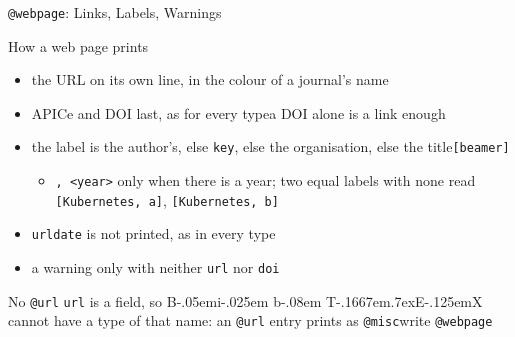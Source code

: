 \documentclass[presentation,\almamaterseal,apice]{beamer}\mode<presentation>{\usetheme{\almamaterpreset}}
\def\BibTeX{{\rm B\kern-.05em{\sc i\kern-.025em b}\kern-.08em
    T\kern-.1667em\lower.7ex\hbox{E}\kern-.125emX}}
\begin{document}
\begin{frame}[c]{\texttt{@webpage}: Links, Labels, Warnings}
%
\begin{block}{How a web page prints}
\begin{itemize}
	\item the URL on its own line, in the colour of a journal's name
	\item APICe and DOI last, as for every type\textemdash{}a DOI alone is a link enough
	\item the label is the author's, else \texttt{key}, else the organisation, else the title\textemdash{}\texttt{[beamer]}
	\begin{itemize}
		\item \texttt{, <year>} only when there is a year; two equal labels with none read \texttt{[Kubernetes, a]}, \texttt{[Kubernetes, b]}
	\end{itemize}
	\item \texttt{urldate} is not printed, as in every type
	\item a warning only with neither \texttt{url} nor \texttt{doi}
\end{itemize}
\end{block}
%
\begin{alertblock}{No \texttt{@url}}
\texttt{url} is a field, so \BibTeX{} cannot have a type of that name: an \texttt{@url} entry prints as \texttt{@misc}\textemdash{}write \texttt{@webpage}
\end{alertblock}
%
\end{frame}

\section*{} 

\frame{\titlepage}

\section*{\refname}

\begin{frame}{\refname}
	\tiny
	
	
\end{frame}

\end{document}
